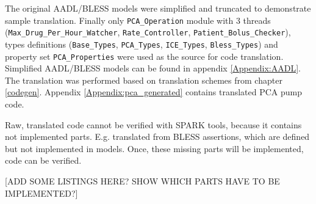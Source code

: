 The original AADL/BLESS models were simplified and truncated to demonstrate sample translation. Finally only \lstinline{PCA_Operation} module with 3 threads (\lstinline{Max_Drug_Per_Hour_Watcher}, \lstinline{Rate_Controller}, \lstinline{Patient_Bolus_Checker}), types definitions (\lstinline{Base_Types}, \lstinline{PCA_Types}, \lstinline{ICE_Types}, \lstinline{Bless_Types}) and property set \lstinline{PCA_Properties} were used as the source for code translation. Simplified AADL/BLESS models can be found in appendix \ref{Appendix:AADL}. The translation was performed based on translation schemes from chapter \ref{codegen}. Appendix \ref{Appendix:pca_generated} contains translated PCA pump code. 

Raw, translated code cannot be verified with SPARK tools, because it contains not implemented parts. E.g. translated from BLESS assertions, which are defined but not implemented in models. Once, these missing parts will be implemented, code can be verified.

[ADD SOME LISTINGS HERE? SHOW WHICH PARTS HAVE TO BE IMPLEMENTED?]

